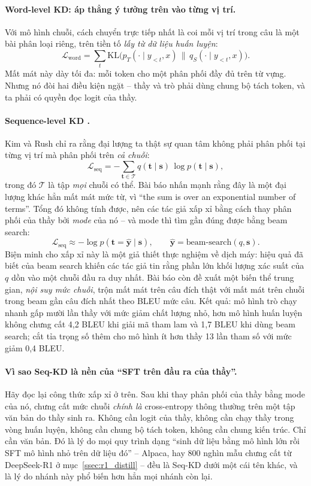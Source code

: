 \paragraph{Word-level KD: áp thẳng ý tưởng trên vào từng vị trí.} Với mô hình chuỗi, cách chuyển trực tiếp nhất là coi mỗi vị trí trong câu là một bài phân loại riêng, trên tiền tố \emph{lấy từ dữ liệu huấn luyện}:
\[
\mathcal{L}_{\text{word}} = \sum_{t} \mathrm{KL}\Big(p_T(\cdot\mid y_{<t}, x)\,\Big\|\, q_S(\cdot\mid y_{<t}, x)\Big).
\]
Mất mát này dày tối đa: mỗi token cho một phân phối đầy đủ trên từ vựng. Nhưng nó đòi hai điều kiện ngặt -- thầy và trò phải dùng chung bộ tách token, và ta phải có quyền đọc logit của thầy.

\paragraph{Sequence-level KD \cite{kim2016sequence}.} Kim và Rush chỉ ra rằng đại lượng ta thật sự quan tâm không phải phân phối tại từng vị trí mà phân phối trên \emph{cả chuỗi}:
\[
\mathcal{L}_{\text{seq}} = -\sum_{\mathbf{t}\in\mathcal{T}} q(\mathbf{t}\mid \mathbf{s})\,\log p(\mathbf{t}\mid \mathbf{s}),
\]
trong đó $\mathcal{T}$ là tập \emph{mọi} chuỗi có thể. Bài báo nhấn mạnh rằng đây là một đại lượng khác hẳn mất mát mức từ, vì ``the sum is over an exponential number of terms''. Tổng đó không tính được, nên các tác giả xấp xỉ bằng cách thay phân phối của thầy bởi \emph{mode} của nó -- và mode thì tìm gần đúng được bằng beam search:
\[
\mathcal{L}_{\text{seq}} \approx -\log p(\mathbf{t} = \hat{\mathbf{y}} \mid \mathbf{s}),
\qquad \hat{\mathbf{y}} = \text{beam-search}(q,\mathbf{s}).
\]
Biện minh cho xấp xỉ này là một giả thiết thực nghiệm về dịch máy: hiệu quả đã biết của beam search khiến các tác giả tin rằng phần lớn khối lượng xác suất của $q$ dồn vào một chuỗi đầu ra duy nhất. Bài báo còn đề xuất một biến thể trung gian, \emph{nội suy mức chuỗi}, trộn mất mát trên câu đích thật với mất mát trên chuỗi trong beam gần câu đích nhất theo BLEU mức câu. Kết quả: mô hình trò chạy nhanh gấp mười lần thầy với mức giảm chất lượng nhỏ, hơn mô hình huấn luyện không chưng cất 4,2 BLEU khi giải mã tham lam và 1,7 BLEU khi dùng beam search; cắt tỉa trọng số thêm cho mô hình ít hơn thầy 13 lần tham số với mức giảm 0,4 BLEU.

\paragraph{Vì sao Seq-KD là nền của ``SFT trên đầu ra của thầy''.} Hãy đọc lại công thức xấp xỉ ở trên. Sau khi thay phân phối của thầy bằng mode của nó, chưng cất mức chuỗi \emph{chính là} cross-entropy thông thường trên một tập văn bản do thầy sinh ra. Không cần logit của thầy, không cần chạy thầy trong vòng huấn luyện, không cần chung bộ tách token, không cần chung kiến trúc. Chỉ cần văn bản. Đó là lý do mọi quy trình dạng ``sinh dữ liệu bằng mô hình lớn rồi SFT mô hình nhỏ trên dữ liệu đó'' -- Alpaca, hay 800 nghìn mẫu chưng cất từ DeepSeek-R1 ở mục~\ref{ssec:r1_distill} -- đều là Seq-KD dưới một cái tên khác, và là lý do nhánh này phổ biến hơn hẳn mọi nhánh còn lại.

